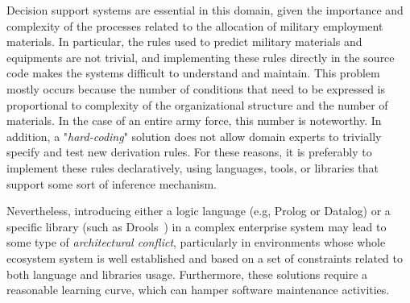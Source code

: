 Decision support systems are essential in this domain, given the importance and complexity of the processes related to the allocation of military employment materials. In particular, the rules used to predict military materials and equipments are not trivial, and implementing these rules directly in the source code makes the systems difficult to understand and maintain. This problem mostly occurs because the number of conditions that need to be expressed is proportional to complexity of the organizational structure and the number of materials. In the case of an entire army force, this number is noteworthy. In addition, a "\emph{hard-coding}" solution does not allow domain experts to trivially specify and test new derivation rules. For these reasons, it is preferably to implement these rules declaratively, using languages, tools, or libraries that support some sort of inference mechanism.


Nevertheless, introducing either a logic language (e.g, Prolog or Datalog) or a specific library (such as  Drools~\cite{amador2012,bali2009,bali2013,browne2009}) in a complex enterprise system may lead to some type of \emph{architectural 
conflict}, particularly in environments whose whole ecosystem system is well established and based on a set of 
constraints related to both language and libraries usage. Furthermore, these solutions require a reasonable learning curve, which can hamper software maintenance activities.


